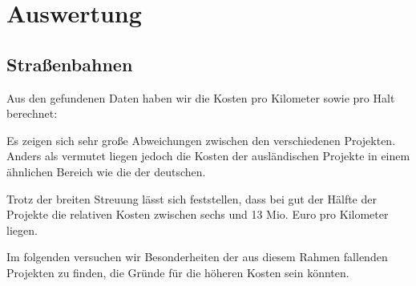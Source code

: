 \chapter{Auswertung}



\section{Straßenbahnen}

Aus den gefundenen Daten haben wir die Kosten pro Kilometer sowie pro Halt berechnet:



Es zeigen sich sehr große Abweichungen zwischen den verschiedenen Projekten. Anders als vermutet liegen jedoch die Kosten der ausländischen Projekte in einem ähnlichen Bereich wie die der deutschen.

Trotz der breiten Streuung lässt sich feststellen, dass bei gut der Hälfte der Projekte die relativen Kosten zwischen sechs und 13 Mio. Euro pro Kilometer liegen.

Im folgenden versuchen wir Besonderheiten der aus diesem Rahmen fallenden Projekten zu finden, die Gründe für die höheren Kosten sein könnten.

